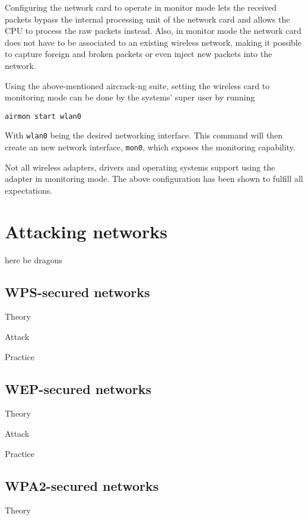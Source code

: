 Configuring the network card to operate in monitor mode lets the received packets bypass the internal processing unit of the network card and allows the CPU to process the raw packets instead. Also, in monitor mode the network card does not have to be associated to an existing wireless network, making it possible to capture foreign and broken packets or even inject new packets into the network.

Using the above-mentioned aircrack-ng suite, setting the wireless card to monitoring mode can be done by the systems' super user by running

\begin{lstlisting}[basicstyle=\ttfamily]
airmon start wlan0
\end{lstlisting}

With \lstinline[basicstyle=\ttfamily]{wlan0} being the desired networking interface. This command will then create an new network interface, \lstinline[basicstyle=\ttfamily]{mon0}, which exposes the monitoring capability.

Not all wireless adapters, drivers and operating systems support using the adapter in monitoring mode. The above configuration has been shown to fulfill all expectations.

\section{Attacking networks}

here be dragons

\subsection{WPS-secured networks}

Theory

Attack

Practice

\subsection{WEP-secured networks}

Theory

Attack

Practice

\subsection{WPA2-secured networks}

Theory

